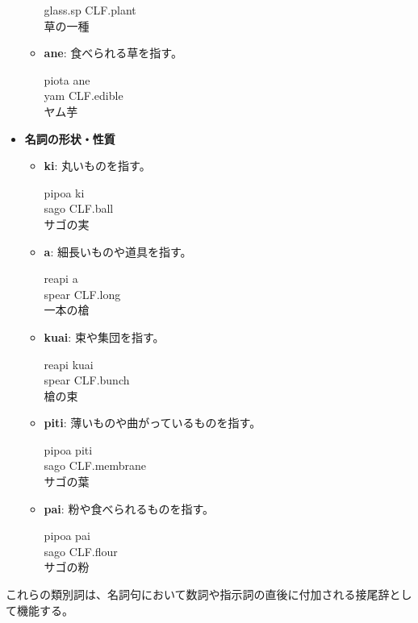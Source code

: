 \begin{itemize}
\begin{itemize}
\begin{exe}
                        glass.sp CLF.plant \\ %
                        \glt 草の一種
                \end{exe}
            \item \textbf{ane}: 食べられる草を指す。
                \begin{exe}
                    \ex \gll piota ane \\
                        yam CLF.edible \\
                        \glt ヤム芋
                \end{exe}
        \end{itemize}
    \item \textbf{名詞の形状・性質}
        \begin{itemize}
            \item \textbf{ki}: 丸いものを指す。
                \begin{exe}
                    \ex \gll pipoa ki \\
                        sago CLF.ball \\
                        \glt サゴの実
                \end{exe}
            \item \textbf{a}: 細長いものや道具を指す。
                \begin{exe}
                    \ex \gll reapi a \\
                        spear CLF.long \\
                        \glt 一本の槍
                \end{exe}
            \item \textbf{kuai}: 束や集団を指す。
                \begin{exe}
                    \ex \gll reapi kuai \\
                        spear CLF.bunch \\
                        \glt 槍の束
                \end{exe}
            \item \textbf{piti}: 薄いものや曲がっているものを指す。
                \begin{exe}
                    \ex \gll pipoa piti \\
                        sago CLF.membrane \\
                        \glt サゴの葉
                \end{exe}
            \item \textbf{pai}: 粉や食べられるものを指す。
                \begin{exe}
                    \ex \gll pipoa pai \\
                        sago CLF.flour \\
                        \glt サゴの粉
                \end{exe}
        \end{itemize}
\end{itemize}
これらの類別詞は、名詞句において数詞や指示詞の直後に付加される接尾辞として機能する。

